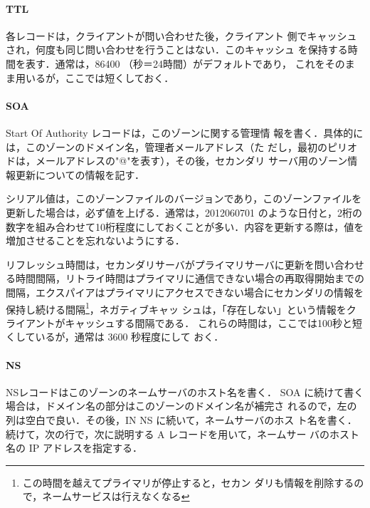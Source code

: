 
\paragraph{TTL} 各レコードは，クライアントが問い合わせた後，クライアント
 側でキャッシュされ，何度も同じ問い合わせを行うことはない．このキャッシュ
 を保持する時間を表す．通常は，86400 （秒＝24時間）がデフォルトであり，
 これをそのまま用いるが，ここでは短くしておく．

\paragraph{SOA} Start Of Authority レコードは，このゾーンに関する管理情
 報を書く．具体的には，このゾーンのドメイン名，管理者メールアドレス（た
 だし，最初のピリオドは，メールアドレスの"@"を表す），その後，セカンダリ
 サーバ用のゾーン情報更新についての情報を記す．

シリアル値は，このゾーンファイルのバージョンであり，このゾーンファイルを
更新した場合は，必ず値を上げる．通常は，2012060701 のような日付と，2桁の
数字を組み合わせて10桁程度にしておくことが多い．内容を更新する際は，値を
増加させることを忘れないようにする．

リフレッシュ時間は，セカンダリサーバがプライマリサーバに更新を問い合わせ
る時間間隔，リトライ時間はプライマリに通信できない場合の再取得開始までの
間隔，エクスパイアはプライマリにアクセスできない場合にセカンダリの情報を
保持し続ける間隔\footnote{この時間を越えてプライマリが停止すると，セカン
ダリも情報を削除するので，ネームサービスは行えなくなる}，ネガティブキャッ
シュは，「存在しない」という情報をクライアントがキャッシュする間隔である．
これらの時間は，ここでは100秒と短くしているが，通常は 3600 秒程度にして
おく．

\paragraph{NS} NSレコードはこのゾーンのネームサーバのホスト名を書く．
SOA に続けて書く場合は，ドメイン名の部分はこのゾーンのドメイン名が補完さ
れるので，左の列は空白で良い．その後，IN NS に続いて，ネームサーバのホス
ト名を書く．続けて，次の行で，次に説明する A レコードを用いて，ネームサー
バのホスト名の IP アドレスを指定する．

